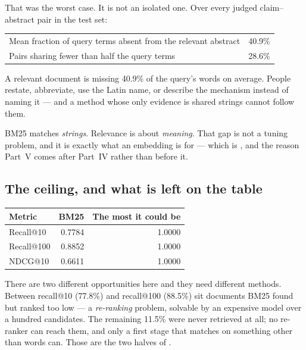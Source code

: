 \documentclass[11pt,a4paper]{article}
\begin{document}
That was the worst case. It is not an isolated one. Over every judged
claim--abstract pair in the test set:

\begin{center}
\small
\begin{tabular}{lr}
\toprule
Mean fraction of query terms absent from the relevant abstract & 40.9\% \\
Pairs sharing fewer than half the query terms                  & 28.6\% \\
\bottomrule
\end{tabular}
\end{center}

A relevant document is missing 40.9\% of the query's words on average. People
restate, abbreviate, use the Latin name, or describe the mechanism instead of
naming it --- and a method whose only evidence is shared strings cannot follow
them.

\begin{keybox}[title={The structural limit}]
BM25 matches \emph{strings}. Relevance is about \emph{meaning}. That gap is not
a tuning problem, and it is exactly what an embedding is for --- which is
, and the reason Part~V comes after Part~IV rather than before it.
\end{keybox}

\subsection{The ceiling, and what is left on the table}

\begin{center}
\small
\begin{tabular}{lrr}
\toprule
\textbf{Metric} & \textbf{BM25} & \textbf{The most it could be} \\
\midrule
Recall@10  & 0.7784 & 1.0000 \\
Recall@100 & 0.8852 & 1.0000 \\
NDCG@10    & 0.6611 & 1.0000 \\
\bottomrule
\end{tabular}
\end{center}

There are two different opportunities here and they need different methods.
Between recall@10 (77.8\%) and recall@100 (88.5\%) sit documents BM25 found but
ranked too low --- a \emph{re-ranking} problem, solvable by an expensive model
over a hundred candidates. The remaining 11.5\% were never retrieved at all; no
re-ranker can reach them, and only a first stage that matches on something
other than words can. Those are the two halves of .
\end{document}
